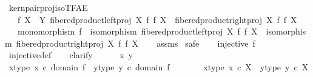 \begin{isabellebody}
\isanewline
%
\endisadelimproof
\isanewline
{}\isamarkupfalse%
\ kern{\isacharunderscore}{\kern0pt}pair{\isacharunderscore}{\kern0pt}proj{\isacharunderscore}{\kern0pt}iso{\isacharunderscore}{\kern0pt}TFAE{}{\isacharcolon}{\kern0pt}\isanewline
\ \ \ {\isachardoublequoteopen}f{\isacharcolon}{\kern0pt}\ X\ {\isasymrightarrow}\ Y{\isachardoublequoteclose}\ {\isachardoublequoteopen}fibered{\isacharunderscore}{\kern0pt}product{\isacharunderscore}{\kern0pt}left{\isacharunderscore}{\kern0pt}proj\ X\ f\ f\ X\ {\isacharequal}{\kern0pt}\ fibered{\isacharunderscore}{\kern0pt}product{\isacharunderscore}{\kern0pt}right{\isacharunderscore}{\kern0pt}proj\ X\ f\ f\ X{\isachardoublequoteclose}\isanewline
\ \ \ {\isachardoublequoteopen}monomorphism\ f\ {\isasymand}\ isomorphism\ {\isacharparenleft}{\kern0pt}fibered{\isacharunderscore}{\kern0pt}product{\isacharunderscore}{\kern0pt}left{\isacharunderscore}{\kern0pt}proj\ X\ f\ f\ X{\isacharparenright}{\kern0pt}\ {\isasymand}\ isomorphism\ {\isacharparenleft}{\kern0pt}fibered{\isacharunderscore}{\kern0pt}product{\isacharunderscore}{\kern0pt}right{\isacharunderscore}{\kern0pt}proj\ X\ f\ f\ X{\isacharparenright}{\kern0pt}{\isachardoublequoteclose}\isanewline
%
\isadelimproof
\ \ %
\endisadelimproof
%
\isatagproof
{}\isamarkupfalse%
\ assms\isanewline
{}\isamarkupfalse%
\ safe\isanewline
\ \ \isamarkupfalse%
\ {\isachardoublequoteopen}injective\ f{\isachardoublequoteclose}\isanewline
\ \ \ \ \isamarkupfalse%
\ injective{\isacharunderscore}{\kern0pt}def\isanewline
\ \ \isamarkupfalse%
\ clarify\isanewline
\ \ \ \ \isamarkupfalse%
\ x\ y\isanewline
\ \ \ \ \isamarkupfalse%
\ x{\isacharunderscore}{\kern0pt}type{\isacharcolon}{\kern0pt}\ {\isachardoublequoteopen}x\ {\isasymin}\isactrlsub c\ domain\ f{\isachardoublequoteclose}\ \ y{\isacharunderscore}{\kern0pt}type{\isacharcolon}{\kern0pt}\ {\isachardoublequoteopen}y\ {\isasymin}\isactrlsub c\ domain\ f{\isachardoublequoteclose}\isanewline
\ \ \ \ \isamarkupfalse%
\ \isamarkupfalse%
\ x{\isacharunderscore}{\kern0pt}type{}{\isacharcolon}{\kern0pt}\ {\isachardoublequoteopen}x\ {\isasymin}\isactrlsub c\ X{\isachardoublequoteclose}\ \ y{\isacharunderscore}{\kern0pt}type{}{\isacharcolon}{\kern0pt}\ {\isachardoublequoteopen}y\ {\isasymin}\isactrlsub c\ X{\isachardoublequoteclose}\isanewline
\ \ \ \ \ \ \isamarkupfalse%

\end{isabellebody}

